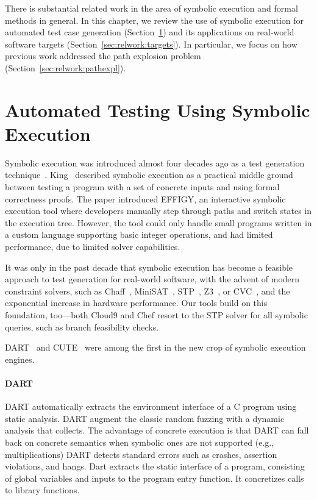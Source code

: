 There is substantial related work in the area of symbolic execution and formal methods in general.  In this chapter, we review the use of symbolic execution for automated test case generation (Section~\ref{sec:relwork:atcg}) and its applications on real-world software targets (Section~\ref{sec:relwork:targets}).  In particular, we focus on how previous work addressed the path explosion problem (Section~\ref{sec:relwork:pathexpl}).

\section{Automated Testing Using Symbolic Execution}
\label{sec:relwork:atcg}

Symbolic execution was introduced almost four decades ago as a test generation technique~\cite{king:symbolic:2, boyer:symbolic}.  King~\cite{king:symbolic:2} described symbolic execution as a practical middle ground between testing a program with a set of concrete inputs and using formal correctness proofs.  The paper introduced EFFIGY, an interactive symbolic execution tool where developers manually step through paths and switch states in the execution tree.  However, the tool could only handle small programs written in a custom language supporting basic integer operations, and had limited performance, due to limited solver capabilities.

It was only in the past decade that symbolic execution has become a feasible approach to test generation for real-world software, with the advent of modern constraint solvers, such as Chaff~\cite{chaff}, MiniSAT~\cite{minisat}, STP~\cite{stp}, Z3~\cite{Z3}, or CVC~\cite{cvc}, and the exponential increase in hardware performance.  Our tools build on this foundation, too---both Cloud9 and Chef resort to the STP solver for all symbolic queries, such as branch feasibility checks.

DART~\cite{dart} and CUTE~\cite{cute} were among the first in the new crop of symbolic execution engines.

\paragraph{DART}

DART automatically extracts the environment interface of a C program using static analysis.  DART augment the classic random fuzzing with a dynamic analysis that collects. The advantage of concrete execution is that DART can fall back on concrete semantics when symbolic ones are not supported (e.g., multiplications) DART detects standard errors such as crashes, assertion violations, and hangs.  Dart extracts the static interface of a program, consisting of global variables and inputs to the program entry function.  It concretizes calls to library functions.

